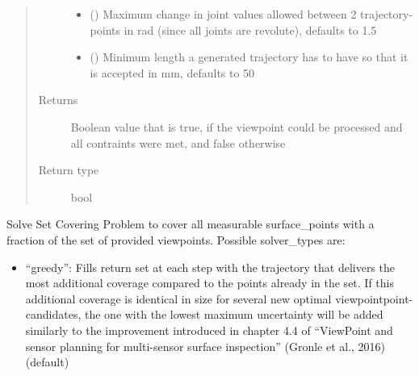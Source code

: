 \documentclass[letterpaper,10pt,english]{sphinxmanual}
\begin{document}
\begin{fulllineitems}
\begin{fulllineitems}
\begin{quote}
\begin{description}
\begin{itemize}
\item {} 
 (\sphinxstyleliteralemphasis{, }) \textendash{} Maximum change in joint values allowed between 2 trajectory-points in rad (since all joints are revolute), defaults to 1.5

\item {} 
 (\sphinxstyleliteralemphasis{, }) \textendash{} Minimum length a generated trajectory has to have so that it is accepted in mm, defaults to 50

\end{itemize}

\item[{Returns}] \leavevmode
Boolean value that is true, if the viewpoint could be processed and all contraints were met, and false otherwise

\item[{Return type}] \leavevmode
bool

\end{description}\end{quote}

\end{fulllineitems}


\begin{fulllineitems}
\label{\detokenize{module_trajectory_manager:agiprobot_measurement.trajectory_manager.TrajectoryManager.solve_scp}}
Solve Set Covering Problem to cover all measurable surface\_points with a fraction of the set of provided viewpoints.
Possible solver\_types are:
\begin{itemize}
\item {} 
“greedy”: Fills return set at each step with the trajectory that delivers the most
additional coverage compared to the points already in the set. If this additional coverage is
identical in size for several new optimal viewpointpoint-candidates, the one with the lowest maximum
uncertainty will be added similarly to the improvement introduced in chapter 4.4 of 
“ViewPoint and sensor planning for multi-sensor surface inspection” (Gronle et al., 2016)  (default)


\end{itemize}
\end{fulllineitems}
\end{fulllineitems}
\end{document}
